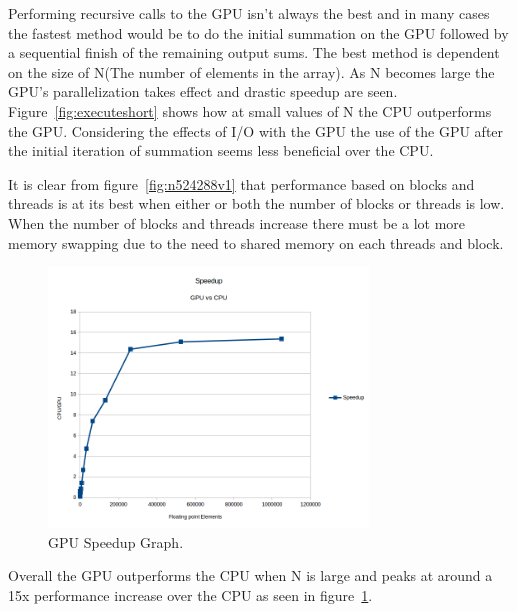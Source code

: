\documentclass[conference]{IEEEtran}
\begin{document}
Performing recursive calls to the GPU isn't always the best and in many cases the fastest method would be to do the initial summation on the GPU followed by a sequential finish of the remaining output sums. The best method is dependent on the size of N(The number of elements in the array). As N becomes large the GPU's parallelization takes effect and drastic speedup are seen. Figure~\ref{fig:executeshort} shows how at small values of N the CPU outperforms the GPU. Considering the effects of I/O with the GPU the use of the GPU after the initial iteration of summation seems less beneficial over the CPU.

It is clear from figure~\ref{fig:n524288v1} that performance based on blocks and threads is at its best when either or both the number of blocks or threads is low. When the number of blocks and threads increase there must be a lot more memory swapping due to the need to shared memory on each threads and block.
\begin{figure}[!t]
  \centering
  \includegraphics[width=8.5cm]{speedup.png}      
  \caption{GPU Speedup Graph.}
  \label{fig:speedup}
\end{figure}
Overall the GPU outperforms the CPU when N is large and peaks at around a 15x performance increase over the CPU as seen in figure~\ref{fig:speedup}.
\end{document}
